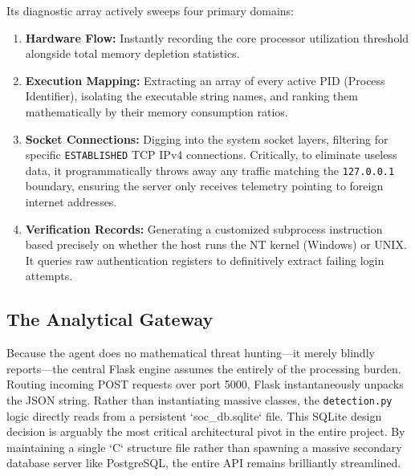 \documentclass[conference]{IEEEtran}
\begin{document}
Its diagnostic array actively sweeps four primary domains:
\begin{enumerate}
    \item \textbf{Hardware Flow:} Instantly recording the core processor utilization threshold alongside total memory depletion statistics.
    \item \textbf{Execution Mapping:} Extracting an array of every active PID (Process Identifier), isolating the executable string names, and ranking them mathematically by their memory consumption ratios.
    \item \textbf{Socket Connections:} Digging into the system socket layers, filtering for specific \verb|ESTABLISHED| TCP IPv4 connections. Critically, to eliminate useless data, it programmatically throws away any traffic matching the \verb|127.0.0.1| boundary, ensuring the server only receives telemetry pointing to foreign internet addresses.
    \item \textbf{Verification Records:} Generating a customized subprocess instruction based precisely on whether the host runs the NT kernel (Windows) or UNIX. It queries raw authentication registers to definitively extract failing login attempts.
\end{enumerate}

\subsection{The Analytical Gateway}
Because the agent does no mathematical threat hunting—it merely blindly reports—the central Flask engine assumes the entirely of the processing burden. 
Routing incoming POST requests over port 5000, Flask instantaneously unpacks the JSON string. Rather than instantiating massive classes, the \verb|detection.py| logic directly reads from a persistent `soc\_db.sqlite` file. This SQLite design decision is arguably the most critical architectural pivot in the entire project. By maintaining a single `C` structure file rather than spawning a massive secondary database server like PostgreSQL, the entire API remains brilliantly streamlined.
\end{document}
